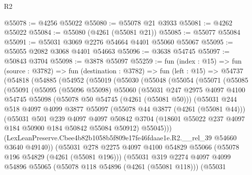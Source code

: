 \begin{lexlean}{R2}
\begin{coremodule}
@55078 := @4256 @55022
@55080 := @55078 @21 @3933
@55081 := @4262 @55022
@55084 := @55080 (@4261 (@55081 @21))
@55085 := @55077 @55084
@55091 := @55031 @3069 @2276 @54664 @4401 @55060 @55067
@55095 := @55055 @2082 @3068 @4401 @54663
@55096 := @3638 @54745
@55097 := @50843 @3704
@55098 := @3878 @55097
@55259 := fun (index : @15) =>
  fun (source : @3782) =>
  fun (destination : @3782) =>
  fun (left : @15) =>
  @54737
    (@54818
      (@54885
        (@54952
          (@55019
            (@55030
              (@55048
                (@55054
                  (@55071
                    (@55085
                      (@55091
                        (@55095
                          (@55096 @55098)
                          @55060
                          (@55031
                            @247
                            @2975
                            @4097
                            @4100
                            @54745
                            @55098
                            (@55078 @50 @54745 (@4261 (@55081 @50)))
                            (@55031
                              @244
                              @518
                              @4097
                              @4099
                              @3877
                              @55097
                              (@55078 @44 @3877 (@4261 (@55081 @44)))
                              (@55031
                                @501
                                @239
                                @4097
                                @4097
                                @50842
                                @3704
                                (@18601 @55022 @237 @4097 @184 @50900 @184 @50842 @55084 @50912)
                                @55045)))
                          (LexLeanPreserve.Cbee4b82b1058b5f809e17fe46fdaae1e.R2.__rel_39
                            @54660
                            @3640
                            @49140))
                        (@55031
                          @278
                          @2275
                          @4097
                          @4100
                          @54829
                          @55066
                          (@55078 @196 @54829 (@4261 (@55081 @196)))
                          (@55031
                            @319
                            @2274
                            @4097
                            @4099
                            @54896
                            @55065
                            (@55078 @118 @54896 (@4261 (@55081 @118)))
                            (@55031

\end{coremodule}
\end{lexlean}
